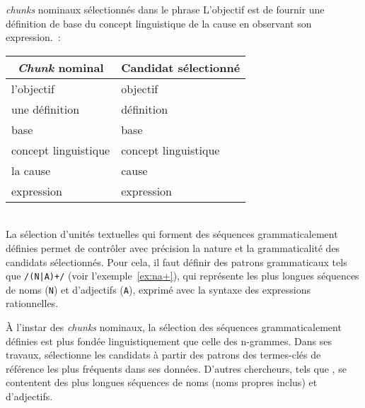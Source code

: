     \begin{example}\label{ex:np_chunks}
      \textit{chunks} nominaux sélectionnés dans le phrase \og{}L'objectif est
      de fournir une définition de base du concept linguistique de la cause en
      observant son expression.\fg{}~:
      \begin{center}
        \begin{tabular}{l|l}
          \toprule
          \multicolumn{1}{c|}{\textbf{\textit{Chunk} nominal}} & \multicolumn{1}{c}{\textbf{Candidat sélectionné}}\\
          \hline
          \og{}l'objectif\fg{} & \og{}objectif\fg{}\\
          \og{}une définition\fg{} & \og{}définition\fg{}\\
          \og{}base\fg{} & \og{}base\fg{}\\
          \og{}concept linguistique\fg{} & \og{}concept linguistique\fg{}\\
          \og{}la cause\fg{} & \og{}cause\\
          \og{}expression\fg{} & \og{}expression\fg{}\\
          \bottomrule
        \end{tabular}
      \end{center}\vspace{.25em}
    \end{example}

    ~\\La sélection d'unités textuelles qui forment des séquences
    grammaticalement définies permet de contrôler
    avec précision la nature et la grammaticalité des candidats sélectionnés.
    Pour cela, il faut définir des patrons grammaticaux tels que
    \texttt{/(N|A)+/} (voir l'exemple~\ref{ex:na+}), qui représente les plus
    longues séquences de noms (\texttt{N}) et d'adjectifs (\texttt{A}), exprimé
    avec la syntaxe des expressions rationnelles.

    À l'instar des \textit{chunks} nominaux, la sélection des séquences
    grammaticalement définies est plus fondée linguistiquement que celle des
    n-grammes. Dans ses travaux, 
    sélectionne les candidats à partir des patrons des termes-clés de référence
    les plus fréquents dans ses données. D'autres chercheurs,
    tels que , se contentent des plus longues
    séquences de noms (noms propres inclus) et d'adjectifs.

